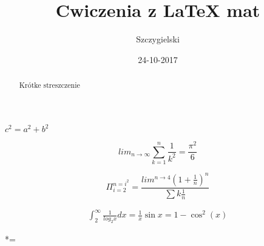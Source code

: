 ﻿\documentclass[a4paper,12pt]{article}
\title{Cwiczenia z LaTeX mat}
\author{Szczygielski}
\date {24-10-2017}
\begin{document}
\maketitle
\begin {abstract} {Krótke streszczenie}
\end {abstract}
$c^{2}=a^{2}+b^{2}$


$$lim_{n \to \infty}
\sum_{k=1}^n \frac{1}{k^2}
= \frac{\pi^2}{6}$$

$${\Pi}_{i=2}^{n=i^2} =\frac{lim^{n \to {4}}(1+\frac{1}{n})^n}{\sum k\frac{1}{n}}$$

\begin {eqnarray}
\int_{2}^{\infty} \frac{1}{log_{2}x}dx=\frac{1}{x}\sin x=1 - \cos^2(x)
\end {eqnarray}

$$ *= 
\end{document}
